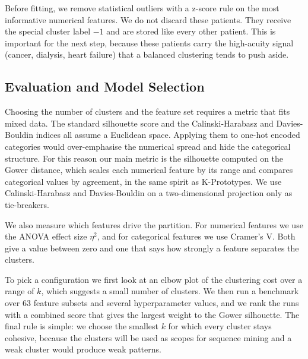 Before fitting, we remove statistical outliers with a z-score rule on the most informative numerical features. We do not discard these patients. They receive the special cluster label $-1$ and are stored like every other patient. This is important for the next step, because these patients carry the high-acuity signal (cancer, dialysis, heart failure) that a balanced clustering tends to push aside.

\subsection{Evaluation and Model Selection}

Choosing the number of clusters and the feature set requires a metric that fits mixed data. The standard silhouette score and the Calinski-Harabasz and Davies-Bouldin indices all assume a Euclidean space. Applying them to one-hot encoded categories would over-emphasise the numerical spread and hide the categorical structure. For this reason our main metric is the silhouette computed on the Gower distance, which scales each numerical feature by its range and compares categorical values by agreement, in the same spirit as K-Prototypes. We use Calinski-Harabasz and Davies-Bouldin on a two-dimensional projection only as tie-breakers.

We also measure which features drive the partition. For numerical features we use the ANOVA effect size $\eta^2$, and for categorical features we use Cramer's V. Both give a value between zero and one that says how strongly a feature separates the clusters.

To pick a configuration we first look at an elbow plot of the clustering cost over a range of $k$, which suggests a small number of clusters. We then run a benchmark over 63 feature subsets and several hyperparameter values, and we rank the runs with a combined score that gives the largest weight to the Gower silhouette. The final rule is simple: we choose the smallest $k$ for which every cluster stays cohesive, because the clusters will be used as scopes for sequence mining and a weak cluster would produce weak patterns.
